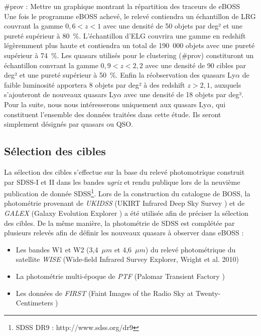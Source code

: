 \documentclass[11pt, twoside, a4paper, openright]{report}
\begin{document}
\#prov : Mettre un graphique montrant la répartition des traceurs de eBOSS \\
Une fois le programme eBOSS achevé, le relevé contiendra un échantillon de LRG couvrant la gamme $0,6 < z < 1$ avec une densité de 50 objets par deg² et une pureté supérieur à 80~\%. L'échantillon d'ELG couvrira une gamme en redshift légèremment plus haute et contiendra un total de 190~000 objets avec une pureté supérieur à 74~\%. Les quasars utilisés pour le clustering (\#prov) constituront un échantillon convrant la gamme $0,9 < z < 2,2$ avec une densité de 90 cibles par deg² et une pureté supérieur à 50~\%. Enfin la réobservation des quasars Ly$\alpha$ de faible luminosité apportera 8 objets par deg² à des redshift $z > 2,1$, auxquels s'ajouteront de nouveaux quasars Ly$\alpha$ avec une densité de 18 objets par deg². \\
Pour la suite, nous nous intéresserons uniquement aux quasars Ly$\alpha$, qui constituent l'ensemble des données traitées dans cette étude. Ils seront simplement désignés par quasars ou QSO.


\subsection{Sélection des cibles}

La sélection des cibles s'effectue sur la base du relevé photomotrique construit par SDSS-I et II dans les bandes \emph{ugriz} et rendu publique lors de la neuvième publication de donnée SDSS\footnote{SDSS DR9 : http://www.sdss.org/dr9}.
Lors de la construction du catalogue de BOSS, la photométrie provenant de \emph{UKIDSS} (UKIRT Infrared Deep Sky Survey \cite{Lawrence2006}) et de \emph{GALEX} (Galaxy Evolution Explorer \cite{Martin2004}) a été utilisée afin de préciser la sélection des cibles.
De la même manière, la photométrie de SDSS est complétée par plusieurs relevés afin de définir les nouveaux quasars à observer dans eBOSS :
\begin{itemize}
\item Les bandes W1 et W2 (3,4~$\mu m$ et 4,6~$\mu m$) du relevé photométrique du satellite \emph{WISE} (Wide-field Infrared Survey Explorer, Wright et al. 2010)
\item La photométrie multi-époque de \emph{PTF} (Palomar Transient Factory \cite{Law2009})
\item Les données de \emph{FIRST} (Faint Images of the Radio Sky at Twenty-Centimeters \cite{Becker1995})
\end{itemize}
\end{document}
